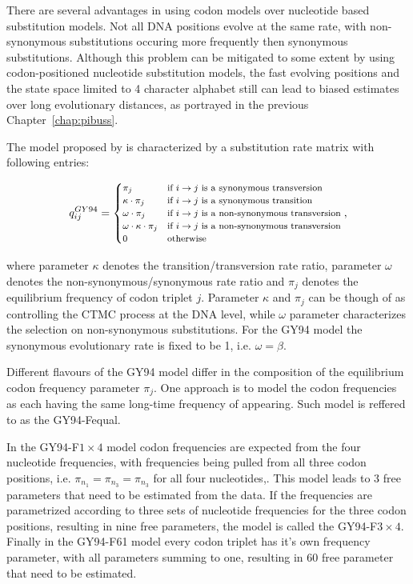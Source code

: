 There are several advantages in using codon models over nucleotide based substitution models.
Not all DNA positions evolve at the same rate, with non-synonymous substitutions occuring more frequently then synonymous substitutions.
Although this problem can be mitigated to some extent by using codon-positioned nucleotide substitution models, the fast evolving positions and the state space limited to 4 character alphabet still can lead to biased estimates over long evolutionary distances, as portrayed in the previous Chapter~\ref{chap:pibuss}.

The model proposed by \cite{Goldman1994} is characterized by a substitution rate matrix with following entries:

\begin{equation}
\footnotesize{
q_{ij}^{GY94}=\begin{cases}
\pi_{j} & \text{if \ensuremath{i\rightarrow j} is a synonymous transversion}\\
\kappa\cdot\pi_{j} & \text{if \ensuremath{i\rightarrow j} is a synonymous transition}\\
\omega\cdot\pi_{j} & \text{if \ensuremath{i\rightarrow j} is a non-synonymous transversion}\\
\omega\cdot\kappa\cdot\pi_{j} & \text{if \ensuremath{i\rightarrow j} is a non-synonymous transversion}\\
0 & \text{otherwise}
\end{cases},
} %
\label{eq:gy94}
\end{equation}

\noindent
where parameter $\kappa$ denotes the transition/transversion rate ratio, parameter $\omega$ denotes the non-synonymous/synonymous
rate ratio and $\pi_j$ denotes the equilibrium frequency of codon triplet $j$.
Parameter $\kappa$ and $\pi_j$ can be though of as controlling the CTMC process at the DNA level, while $\omega$ parameter characterizes the selection on non-synonymous substitutions.
For the GY94 model the synonymous evolutionary rate is fixed to be 1, i.e. $\omega=\beta$.

Different flavours of the GY94 model differ in the composition of the equilibrium codon frequency parameter $\pi_{j}$.
One approach is to model the codon frequencies as each having the same long-time frequency of appearing. 
Such model is reffered to as the GY94-Fequal.

In the GY94-F$1\times4$ model codon frequencies are expected from the four nucleotide frequencies, with frequencies being pulled from all three codon positions, i.e. $\pi_{n_{1}}=\pi_{n_{3}}=\pi_{n_{3}}$ for all four nucleotides,.
This model leads to 3 free parameters that need to be estimated from the data.
If the frequencies are parametrized according to three sets of nucleotide frequencies for the three codon positions, resulting in nine free parameters, the model is called the GY94-F$3\times4$.
Finally in the GY94-F61 model every codon triplet has it's own frequency parameter, with all parameters summing to one, resulting in 60 free parameter that need to be estimated.

